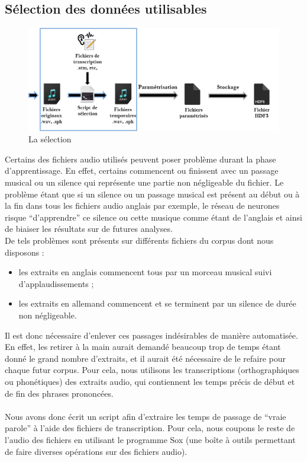 \documentclass{article}
\begin{document}
\subsection{Sélection des données utilisables}

\hphantom{.}
\begin{figure}[h]
  \centerline{\includegraphics[scale=0.7]{img/schema_selection.png}}
  \caption{La sélection}
\end{figure}

Certains des fichiers audio utilisés peuvent poser problème durant la phase d'apprentissage. En effet, certains commencent ou finissent avec un passage musical ou un silence qui représente une partie non négligeable du fichier. Le problème étant que si un silence ou un passage musical est présent au début ou à la fin dans tous les fichiers audio anglais par exemple, le réseau de neurones risque ``d'apprendre'' ce silence ou cette musique comme étant de l'anglais et ainsi de biaiser les résultats sur de futures analyses.\\
\noindent De tels problèmes sont présents sur différents fichiers du corpus dont nous disposons :
\begin{itemize}
    \item les extraits en anglais commencent tous par un morceau musical suivi d'applaudissements ;

    \item les extraits en allemand commencent et se terminent par un silence de durée non négligeable.
    \end{itemize}
    
\noindent Il est donc nécessaire d'enlever ces passages indésirables de manière automatisée. En effet, les retirer à la main aurait demandé beaucoup trop de temps étant donné le grand nombre d'extraits, et il aurait été nécessaire de le refaire pour chaque futur corpus. Pour cela, nous utilisons les transcriptions (orthographiques ou phonétiques) des extraits audio, qui contiennent les temps précis de début et de fin des phrases prononcées.\\
 \\
 Nous avons donc écrit un script afin d'extraire les temps de passage de ``vraie parole'' à l'aide des fichiers de transcription. Pour cela, nous coupons le reste de l'audio des fichiers en utilisant le programme Sox\cite{docSox} (une boîte à outils permettant de faire diverses opérations sur des fichiers audio).
\end{document}
